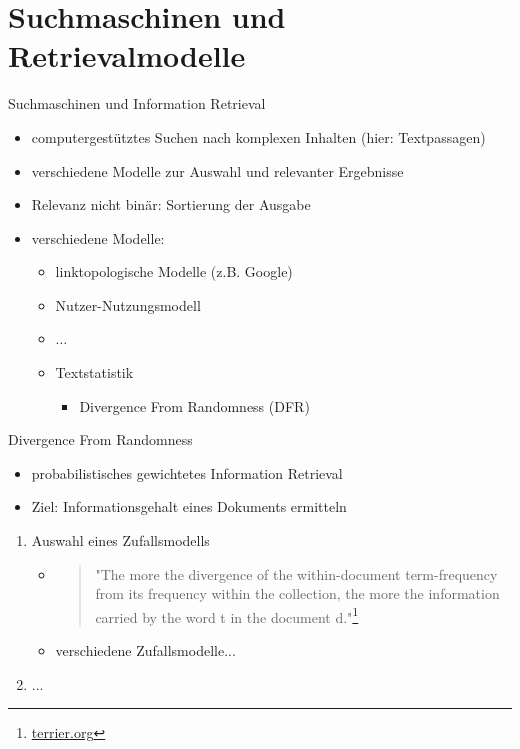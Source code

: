 \documentclass{beamer}
\begin{document}
	\section{Suchmaschinen und Retrievalmodelle}
	\begin{frame}{Suchmaschinen und Information Retrieval}
		\begin{itemize}
			\item computergestütztes Suchen nach komplexen Inhalten (hier: Textpassagen)
			\item verschiedene Modelle zur Auswahl und relevanter Ergebnisse
			\item Relevanz nicht binär: Sortierung der Ausgabe
			\item verschiedene Modelle:
			\begin{itemize}
				\item linktopologische Modelle (z.B. Google)
				\item Nutzer-Nutzungsmodell
				\item $\ldots$
				\item Textstatistik
				\begin{itemize}
					\item Divergence From Randomness (DFR)
				\end{itemize}
			\end{itemize}
		\end{itemize}
	\end{frame}

	\begin{frame}{Divergence From Randomness}
		\begin{itemize}
			\item probabilistisches gewichtetes Information Retrieval
			\item Ziel: Informationsgehalt eines Dokuments ermitteln
		\end{itemize}
		\begin{enumerate}
			\item Auswahl eines Zufallsmodells
			\begin{itemize}
				\item \begin{quote}
					"The more the divergence of the within-document term-frequency from its frequency within the collection, the more the information carried by the word t in the document d."\footnote{\href{http://terrier.org/docs/v3.5/dfr_description.html}{terrier.org}}
				\end{quote}
				\item verschiedene Zufallsmodelle...
			\end{itemize}
			\item ...
		\end{enumerate}
	\end{frame}
\end{document}
